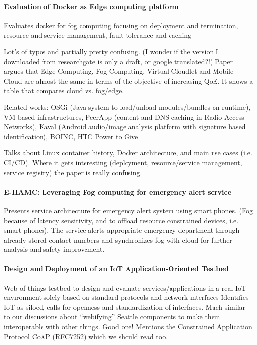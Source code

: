 \paragraph{Evaluation of Docker as Edge computing platform}\cite{ismail_evaluation_2015}
Evaluates docker for fog computing focusing on deployment and termination, resource and service management, fault tolerance and caching

Lot's of typos and partially pretty confusing. (I wonder if the version I downloaded from researchgate is only a draft, or google translated?!) Paper argues that Edge Computing, Fog Computing, Virtual Cloudlet and Mobile Cloud are almost the same in terms of the objective of increasing QoE. It shows a table that compares cloud vs. fog/edge.

Related works:
OSGi (Java system to load/unload modules/bundles on runtime), VM based infrastructures, PeerApp (content and DNS caching in Radio Access Networks), Kaval (Android audio/image analysis platform with signature based identification), BOINC, HTC Power to Give

Talks about Linux container history, Docker architecture, and main use cases (i.e. CI/CD).
Where it gets interesting (deployment, resource/service management, service registry) the paper is really confusing.


\paragraph{E-HAMC: Leveraging Fog computing for emergency alert service} \cite{7134091}
Presents service architecture for emergency alert system using smart phones. (Fog because of latency sensitivity, and to offload resource constrained devices, i.e. smart phones). The service alerts appropriate emergency department through already stored contact numbers and synchronizes fog with cloud for further analysis and safety improvement.

\paragraph{Design and Deployment of an IoT Application-Oriented Testbed}\cite{belli_design_2015}
Web of things testbed to design and evaluate services/applications in a real IoT environment solely based on standard protocols and network interfaces
Identifies IoT as siloed, calls for openness and standardization of interfaces. Much similar to our discussions about ``webifying'' Seattle components to make them interoperable with other things. Good one! Mentions the Constrained Application Protocol CoAP (RFC7252) which we should read too.

